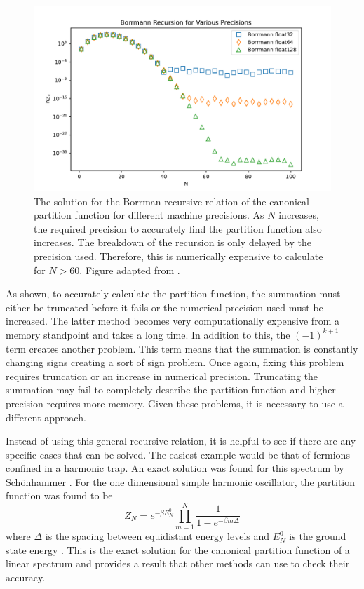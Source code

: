 \begin{figure}[H]
    \centering
    \includegraphics[scale=0.6]{figures/pdf/Borrmann accuracy.pdf}
    \caption{The solution for the Borrman recursive relation of the canonical partition function for different machine precisions. As $N$ increases, the required precision to accurately find the partition function also increases. The breakdown of the recursion is only delayed by the precision used. Therefore, this is numerically expensive to calculate for $N>60$. Figure adapted from \cite{Jiang}.}
    \label{fig:BorrmannAcc}
\end{figure}
As shown, to accurately calculate the partition function, the summation must either be truncated before it fails or the numerical precision used must be increased. The latter method becomes very computationally expensive from a memory standpoint and takes a long time. 
In addition to this, the $(-1)^{k+1}$ term creates another problem. This term means that the summation is constantly changing signs creating a sort of sign problem. Once again, fixing this problem requires truncation or an increase in numerical precision. Truncating the summation may fail to completely describe the partition function and higher precision requires more memory. Given these problems, it is necessary to use a different approach. 

Instead of using this general recursive relation, it is helpful to see if there are any specific cases that can be solved. The easiest example would be that of fermions confined in a harmonic trap. An exact solution was found for this spectrum by Sch\"onhammer \cite{Schon1996}. For the one dimensional simple harmonic oscillator, the partition function was found to be
\begin{equation}
    Z_N=e^{-\beta E_N^0} \prod_{m=1}^N \frac{1}{1-e^{-\beta m\Delta}} \label{schoneqn}
\end{equation}
where $\Delta$ is the spacing between equidistant energy levels and $E_N^0$ is the ground state energy \cite{Schon1996}. This is the exact solution for the canonical partition function of a linear spectrum and provides a result that other methods can use to check their accuracy.


